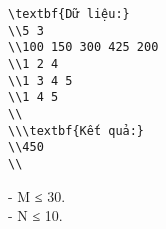 \begin{verbatim}
\textbf{Dữ liệu:}
\\5 3
\\100 150 300 425 200
\\1 2 4
\\1 3 4 5
\\1 4 5
\\
\\\textbf{Kết quả:}
\\450
\\\end{verbatim}
- M ≤ 30.   
\\   - N ≤ 10.